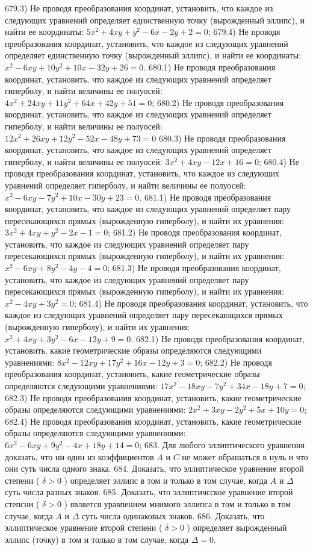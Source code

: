 679.3) Не проводя преобразования координат, установить, что каждое из следующих уравнений определяет единственную точку (вырожденный эллипс), и найти ее координаты: $5 x^2+4 x y+y^2-6 x-2 y+2=0$;
679.4) Не проводя преобразования координат, установить, что каждое из следующих уравнений определяет единственную точку (вырожденный эллипс), и найти ее координаты: $x^2-6 x y+10 y^2+10 x-32 y+26=0$.
680.1) Не проводя преобразования координат, установить, что каждое из следующих уравнений определяет гиперболу, и найти величины ее полуосей: $4 x^2+24 x y+11 y^2+64 x+42 y+51=0$;
680.2) Не проводя преобразования координат, установить, что каждое из следующих уравнений определяет гиперболу, и найти величины ее полуосей: $12 x^2+26 x y+12 y^2-52 x-48 y+73=0$
680.3) Не проводя преобразования координат, установить, что каждое из следующих уравнений определяет гиперболу, и найти величины ее полуосей: $3 x^2+4 x y-12 x+16=0$;
680.4) Не проводя преобразования координат, установить, что каждое из следующих уравнений определяет гиперболу, и найти величины ее полуосей: $x^2-6 x y-7 y^2+10 x-30 y+23=0$.
681.1) Не проводя преобразования координат, установить, что каждое из следующих уравнений определяет пару пересекающихся прямых (вырожденную гиперболу), и найти их уравнения: $3 x^2+4 x y+y^2-2 x-1=0$;
681.2) Не проводя преобразования координат, установить, что каждое из следующих уравнений определяет пару пересекающихся прямых (вырожденную гиперболу), и найти их уравнения: $x^2-6 x y+8 y^2-4 y-4=0$;
681.3) Не проводя преобразования координат, установить, что каждое из следующих уравнений определяет пару пересекающихся прямых (вырожденную гиперболу), и найти их уравнения: $x^2-4 x y+3 y^2=0$;
681.4) Не проводя преобразования координат, установить, что каждое из следующих уравнений определяет пару пересекающихся прямых (вырожденную гиперболу), и найти их уравнения: $x^2+4 x y+3 y^2-6 x-12 y+9=0$.
682.1) Не проводя преобразования координат, установить, какие геометрические образы определяются следующими уравнениями: $8 x^2-12 x y+17 y^2+16 x-12 y+3=0$;
682.2) Не проводя преобразования координат, установить, какие геометрические образы определяются следующими уравнениями: $17 x^2-18 x y-7 y^2+34 x-18 y+7=0$;
682.3) Не проводя преобразования координат, установить, какие геометрические образы определяются следующими уравнениями: $2 x^2+3 x y-2 y^2+5 x+10 y=0$;
682.4) Не проводя преобразования координат, установить, какие геометрические образы определяются следующими уравнениями: $6 x^2-6 x y+9 y^2-4 x+18 y+14=0$;
683. Для любого эллиптического уравнения доказать, что ни один из коэффициентов $A$ и $C$ не может обрашаться в нуль и что они суть числа одного знака.
684. Доказать, что эллиптическое уравнение второй степени ( $\delta>0$ ) определяет эллипс в том и только в том случае, когда $A$ и $\Delta$ суть числа разных знаков.
685. Доказать, что эллиптичсское уравнение второй степсни ( $\delta>0$ ) является уравпением мнимого эллипса в том и только в том случае, когда $A$ и $\Delta$ суть числа одинаковых знаков.
686. Доказать, что эллиптическое уравнение второй степени ( $\delta>0$ ) определяет вырожденный эллипс (точку) в том и только в том случае, когда $\Delta=0$.
